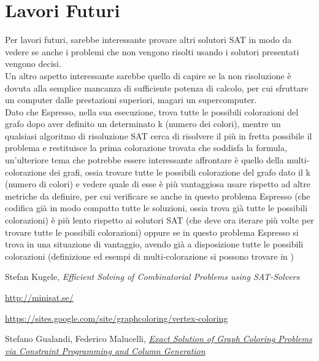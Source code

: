\documentclass[a4paper,11pt]{article} %
\begin{document}
\section{Lavori Futuri}
Per lavori futuri, sarebbe interessante provare altri solutori SAT in modo da vedere se anche i problemi che non vengono risolti usando i solutori presentati vengono decisi.\\
Un altro aspetto interessante sarebbe quello di capire se la non risoluzione è dovuta alla semplice mancanza di sufficiente potenza di calcolo, per cui sfruttare un computer dalle prestazioni superiori, magari un supercomputer.\\
Dato che Espresso, nella sua esecuzione, trova tutte le possibili colorazioni del grafo dopo aver definito un determinato k (numero dei colori), mentre un qualsiasi algoritmo di risoluzione SAT cerca di risolvere il più in fretta possibile il problema e restituisce la prima colorazione trovata che soddisfa la formula, un'ulteriore tema che potrebbe essere interessante affrontare è quello della multi-colorazione dei grafi, ossia trovare tutte le possibili colorazione del grafo dato il k (numero di colori) e vedere quale di esse è più vantaggiosa usare rispetto ad altre metriche da definire, per cui verificare se anche in questo problema Espresso (che codifica già in modo compatto tutte le soluzioni, ossia trova già tutte le possibili colorazioni) è più lento rispetto ai solutori SAT (che deve ora iterare più volte per trovare tutte le possibili colorazioni) oppure se in questo problema Espresso si trova in una situazione di vantaggio, avendo già a disposizione tutte le possibili colorazioni (definizione ed esempi di multi-colorazione si possono trovare in \cite{tesi2})


\pagebreak

\begin{thebibliography}{9}
	 Stefan Kugele,  
	\emph{Efficient Solving of Combinatorial Problems using SAT-Solvers}
	
	 \href{http://minisat.se/}{http://minisat.se/}
	
	 \href{https://sites.google.com/site/graphcoloring/vertex-coloring}{https://sites.google.com/site/graphcoloring/vertex-coloring}
	
	 Stefano Gualandi, Federico Malucelli,  \href{http://www.optimization-online.org/DB_FILE/2010/03/2568.pdf}{\emph{Exact Solution of Graph Coloring Problems via Constraint Programming and Column Generation}}
\end{thebibliography}
\end{document}
